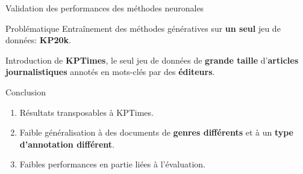 %    


\begin{frame}{Validation des performances des méthodes neuronales}

    \begin{block}{Problématique}
    Entraînement des méthodes génératives sur \textbf{un seul} jeu de données: \textbf{KP20k}.
    \end{block}
    
    Introduction de \textbf{KPTimes}, le seul jeu de données de \textbf{grande taille} d'\textbf{articles journalistiques} annotés en mots-clés par des \textbf{éditeurs}.
    
    \begin{block}{Conclusion}
    \begin{enumerate}
        \item Résultats transposables à KPTimes.
        \item Faible généralisation à des documents de \textbf{genres différents} et à un \textbf{type d'annotation différent}.
        \item Faibles performances en partie liées à l'évaluation.
    \end{enumerate}
    \end{block}

\end{frame}